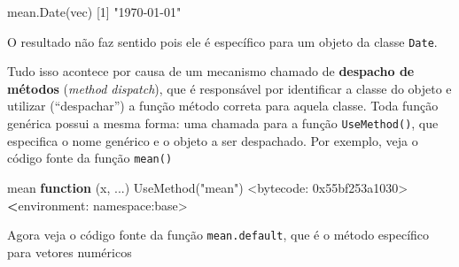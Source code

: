 \documentclass[
  10pt,
  a4paper]{book}
\newenvironment{Shaded}{\begin{snugshade}}{\end{snugshade}}
\newcommand{\ControlFlowTok}[1]{\textcolor[rgb]{0.13,0.29,0.53}{\textbf{#1}}}
\newcommand{\DecValTok}[1]{\textcolor[rgb]{0.00,0.00,0.81}{#1}}
\newcommand{\ErrorTok}[1]{\textcolor[rgb]{0.64,0.00,0.00}{\textbf{#1}}}
\newcommand{\FunctionTok}[1]{\textcolor[rgb]{0.00,0.00,0.00}{#1}}
\newcommand{\NormalTok}[1]{#1}
\newcommand{\SpecialCharTok}[1]{\textcolor[rgb]{0.00,0.00,0.00}{#1}}
\newcommand{\StringTok}[1]{\textcolor[rgb]{0.31,0.60,0.02}{#1}}
\begin{document}
\begin{Shaded}
\begin{Highlighting}[]
\FunctionTok{mean.Date}\NormalTok{(vec)}
\NormalTok{[}\DecValTok{1}\NormalTok{] }\StringTok{"1970{-}01{-}01"}
\end{Highlighting}
\end{Shaded}

O resultado não faz sentido pois ele é específico para um objeto da
classe \texttt{Date}.

Tudo isso acontece por causa de um mecanismo chamado de \textbf{despacho de
métodos} (\emph{method dispatch}), que é responsável por identificar a
classe do objeto e utilizar (``despachar'') a função método correta para
aquela classe. Toda função genérica possui a mesma forma: uma chamada
para a função \texttt{UseMethod()}, que especifica o nome genérico e o objeto a
ser despachado. Por exemplo, veja o código fonte da função \texttt{mean()}

\begin{Shaded}
\begin{Highlighting}[]
\NormalTok{mean}
\ControlFlowTok{function}\NormalTok{ (x, ...) }
\FunctionTok{UseMethod}\NormalTok{(}\StringTok{"mean"}\NormalTok{)}
\SpecialCharTok{\textless{}}\NormalTok{bytecode}\SpecialCharTok{:} \DecValTok{0x55bf253a1030}\SpecialCharTok{\textgreater{}}
\ErrorTok{\textless{}}\NormalTok{environment}\SpecialCharTok{:}\NormalTok{ namespace}\SpecialCharTok{:}\NormalTok{base}\SpecialCharTok{\textgreater{}}
\end{Highlighting}
\end{Shaded}

Agora veja o código fonte da função \texttt{mean.default}, que é o método
específico para vetores numéricos
\end{document}
